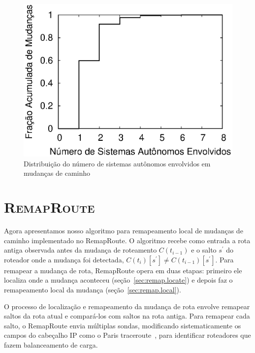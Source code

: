 \documentclass{JBCS}
\newcommand{\rmprt}{{Re\-map\-Rou\-te}}
\newcommand{\secstr}{seção}
\begin{document}

\begin{figure}[t]
\begin{center}
\includegraphics[width=0.96\columnwidth]{figs/nasns.eps}
\caption{Distribuição do número de sistemas autônomos envolvidos em
mudanças de caminho}
\label{fig:char.nasns}
\end{center}
\end{figure}

\section{\textbf{\textsc{RemapRoute}}}
\label{sec:remap}

Agora apresentamos nosso algoritmo para remapeamento local de mudanças
de caminho implementado no \rmprt{}.  O algoritmo recebe como entrada a
rota antiga observada antes da mudança de roteamento $C(t_{i-1})$ e o
salto $s^\prime$ do roteador onde a mudança foi detectada,
$C(t_i)[s^\prime] \ne C(t_{i-1})[s^\prime]$.  Para remapear a mudança de
rota, \rmprt{} opera em duas etapas: primeiro ele localiza onde a
mudança aconteceu (\secstr~\ref{sec:remap.locate}) e depois faz o
remapeamento local da mudança (\secstr~\ref{sec:remap.local}).

O processo de localização e remapeamento da mudança de rota envolve
remapear saltos da rota atual e compará-los com saltos na rota antiga.
Para remapear cada salto, o \rmprt{} envia múltiplas sondas, modificando
sistematicamente os campos do cabeçalho IP como o Paris
traceroute~\cite{augustin07, veitch09balancer}, para identificar
roteadores que fazem balanceamento de carga.
\end{document}
